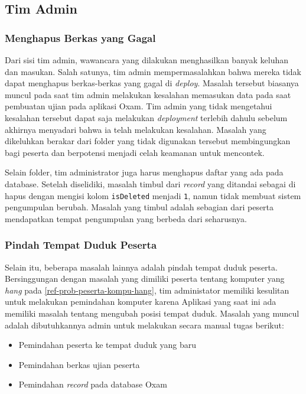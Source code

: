\subsection{Tim Admin}
    \subsubsection{Menghapus Berkas yang
    Gagal}\label{ref-prob-admin-berkas-gagal} 
    Dari sisi tim admin, wawancara yang
    dilakukan menghasilkan banyak keluhan dan masukan. Salah satunya, tim admin
    mempermasalahkan bahwa mereka tidak dapat menghapus berkas-berkas yang gagal
    di \textit{deploy}. Masalah tersebut biasanya muncul pada saat tim admin
    melakukan kesalahan memasukan data pada saat pembuatan ujian pada aplikasi
    Oxam. Tim admin yang tidak mengetahui kesalahan tersebut dapat saja
    melakukan \textit{deployment} terlebih dahulu sebelum akhirnya menyadari
    bahwa ia telah melakukan kesalahan. Masalah yang dikeluhkan berakar dari
    folder yang tidak digunakan tersebut membingungkan bagi peserta dan
    berpotensi menjadi celah keamanan untuk mencontek.

    Selain folder, tim administrator juga harus menghapus daftar yang ada pada
    database. Setelah diselidiki, masalah timbul dari \textit{record} yang
    ditandai sebagai di hapus dengan mengisi kolom \texttt{isDeleted} menjadi
    \texttt{1}, namun tidak membuat sistem pengumpulan berubah. Masalah yang
    timbul adalah sebagian dari peserta mendapatkan tempat pengumpulan yang
    berbeda dari seharusnya.

    \subsubsection{Pindah Tempat Duduk Peserta}\label{ref-prob-admin-pindah}
    Selain itu, beberapa masalah lainnya adalah pindah tempat duduk peserta.
    Bersinggungan dengan masalah yang dimiliki peserta tentang komputer yang
    \textit{hang} pada \ref{ref-prob-peserta-kompu-hang}, tim administator
    memiliki kesulitan untuk melakukan pemindahan komputer karena Aplikasi yang
    saat ini ada memiliki masalah tentang mengubah posisi tempat duduk. Masalah
    yang muncul adalah dibutuhkannya admin untuk melakukan secara manual tugas berikut:
    \begin{itemize}
        \item Pemindahan peserta ke tempat duduk yang baru
        \item Pemindahan berkas ujian peserta
        \item Pemindahan \textit{record} pada database Oxam
    \end{itemize}

